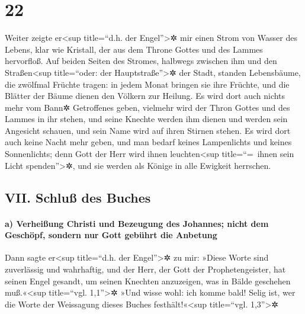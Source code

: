 \hypertarget{section-21}{%
\section{22}\label{section-21}}

 Weiter zeigte er\textless sup title=``d.h. der
Engel''\textgreater✲ mir einen Strom von Wasser des Lebens, klar wie
Kristall, der aus dem Throne Gottes und des Lammes hervorfloß.
 Auf beiden Seiten des Stromes, halbwegs zwischen ihm und
den Straßen\textless sup title=``oder: der Hauptstraße''\textgreater✲
der Stadt, standen Lebensbäume, die zwölfmal Früchte tragen: in jedem
Monat bringen sie ihre Früchte, und die Blätter der Bäume dienen den
Völkern zur Heilung.  Es wird dort auch nichts mehr vom
Bann✲ Getroffenes geben, vielmehr wird der Thron Gottes und des Lammes
in ihr stehen, und seine Knechte werden ihm dienen  und
werden sein Angesicht schauen, und sein Name wird auf ihren Stirnen
stehen.  Es wird dort auch keine Nacht mehr geben, und man
bedarf keines Lampenlichts und keines Sonnenlichts; denn Gott der Herr
wird ihnen leuchten\textless sup title=``=~ihnen sein Licht
spenden''\textgreater✲, und sie werden als Könige in alle Ewigkeit
herrschen.

\hypertarget{vii.-schluuxdf-des-buches}{%
\subsection{VII. Schluß des Buches}\label{vii.-schluuxdf-des-buches}}

\hypertarget{a-verheiuxdfung-christi-und-bezeugung-des-johannes-nicht-dem-geschuxf6pf-sondern-nur-gott-gebuxfchrt-die-anbetung}{%
\paragraph{a) Verheißung Christi und Bezeugung des Johannes; nicht dem
Geschöpf, sondern nur Gott gebührt die
Anbetung}\label{a-verheiuxdfung-christi-und-bezeugung-des-johannes-nicht-dem-geschuxf6pf-sondern-nur-gott-gebuxfchrt-die-anbetung}}

 Dann sagte er\textless sup title=``d.h. der
Engel''\textgreater✲ zu mir: »Diese Worte sind zuverlässig und
wahrhaftig, und der Herr, der Gott der Prophetengeister, hat seinen
Engel gesandt, um seinen Knechten anzuzeigen, was in Bälde geschehen
muß.«\textless sup title=``vgl. 1,1''\textgreater✲  »Und
wisse wohl: ich komme bald! Selig ist, wer die Worte der Weissagung
dieses Buches festhält!«\textless sup title=``vgl. 1,3''\textgreater✲


